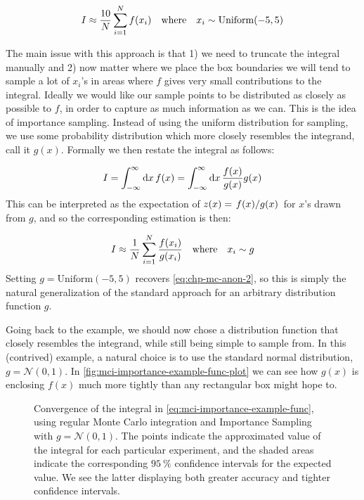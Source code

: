\documentclass[Thesis.tex]{subfiles}
\begin{document}
\begin{align}
    \label{eq:chp-mc-anon-2}
    I\approx \frac{10}{N}\sum_{i=1}^Nf(x_i)\qq{where} x_i\sim\text{Uniform}(-5, 5)
\end{align}

The main issue with this approach is that 1) we need to truncate the integral
manually and 2) now matter where we place the box boundaries we will tend to
sample a lot of $x_i$'s in areas where $f$ gives very small contributions to
the integral. Ideally we would like our sample points to be distributed as
closely as possible to $f$, in order to capture as much information as we can.
This is the idea of importance sampling. Instead of using the uniform
distribution for sampling, we use some probability distribution which more
closely resembles the integrand, call it $g(x)$. Formally we then restate the integral as follows:

\begin{align}
    I = \int_{-\infty}^{\infty}\dd{x}f(x) = \int_{-\infty}^{\infty}\dd{x} \frac{f(x)}{g(x)} g(x)
\end{align}
This can be interpreted as the expectation of $z(x)=\flatfrac{f(x)}{g(x)}$ for $x$'s drawn from $g$, and so the corresponding estimation is then:

\begin{align}
    I \approx \frac{1}{N} \sum_{i=1}^N \frac{f(x_i)}{g(x_i)} \qq{where} x_i\sim g
\end{align}
Setting $g = \text{Uniform}(-5, 5)$ recovers \autoref{eq:chp-mc-anon-2}, so this is simply the natural generalization of the standard approach for an arbitrary distribution function $g$.


Going back to the example, we should now chose a distribution function that
closely resembles the integrand, while still being simple to sample from. In
this (contrived) example, a natural choice is to use the standard normal
distribution, $g = \mathcal{N}(0, 1)$. In
\autoref{fig:mci-importance-example-func-plot} we can see how $g(x)$ is
enclosing $f(x)$ much more tightly than any rectangular box might hope to.

\begin{figure}
   \centering
    \resizebox{0.7\linewidth}{!}{%
        
    }
    \caption[Convergence of Monte Carlo Integration]{\label{fig:mci-importance-example-func-convergence}Convergence of
    the integral in \autoref{eq:mci-importance-example-func}, using regular
    Monte Carlo integration and Importance Sampling with $g = \mathcal{N}(0,
    1)$. The points indicate the approximated value of the integral for each
    particular experiment, and the shaded areas indicate the corresponding
    $\SI{95}{\percent}$ confidence intervals for the expected value. We see the
    latter displaying both greater accuracy and tighter confidence intervals.
    }
\end{figure}
\end{document}
